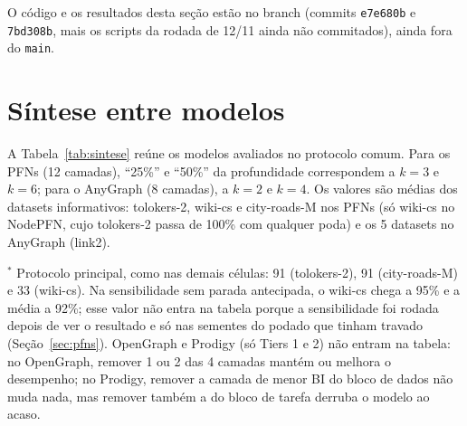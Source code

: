 \documentclass[12pt,a4paper]{article}
\begin{document}
\noindent O código e os resultados desta seção estão no branch  (commits \texttt{e7e680b} e \texttt{7bd308b}, mais os scripts da rodada de 12/11 ainda não commitados), ainda fora do \texttt{main}.

\section{Síntese entre modelos}
\label{sec:sintese}

A Tabela~\ref{tab:sintese} reúne os modelos avaliados no protocolo comum. Para os PFNs (12 camadas), ``25\%'' e ``50\%'' da profundidade correspondem a $k=3$ e $k=6$; para o AnyGraph (8 camadas), a $k=2$ e $k=4$. Os valores são médias dos datasets informativos: tolokers-2, wiki-cs e city-roads-M nos PFNs (só wiki-cs no NodePFN, cujo tolokers-2 passa de 100\% com qualquer poda) e os 5 datasets no AnyGraph (link2).

\begin{table}[H]
\centering
\caption{Síntese: retido (\%) pela melhor ordem de BI (token-alvo nos PFNs) e pela ordem aleatória (mediana), correlação BI $\times$ importância, KD com $\approx$50\% dos parâmetros e redução de latência com 50\% das camadas.}
\label{tab:sintese}
\end{table}

\noindent $^*$ Protocolo principal, como nas demais células: 91 (tolokers-2), 91 (city-roads-M) e 33 (wiki-cs). Na sensibilidade sem parada antecipada, o wiki-cs chega a 95\% e a média a 92\%; esse valor não entra na tabela porque a sensibilidade foi rodada depois de ver o resultado e só nas sementes do podado que tinham travado (Seção~\ref{sec:pfns}). OpenGraph e Prodigy (só Tiers 1 e 2) não entram na tabela: no OpenGraph, remover 1 ou 2 das 4 camadas mantém ou melhora o desempenho; no Prodigy, remover a camada de menor BI do bloco de dados não muda nada, mas remover também a do bloco de tarefa derruba o modelo ao acaso.
\end{document}
